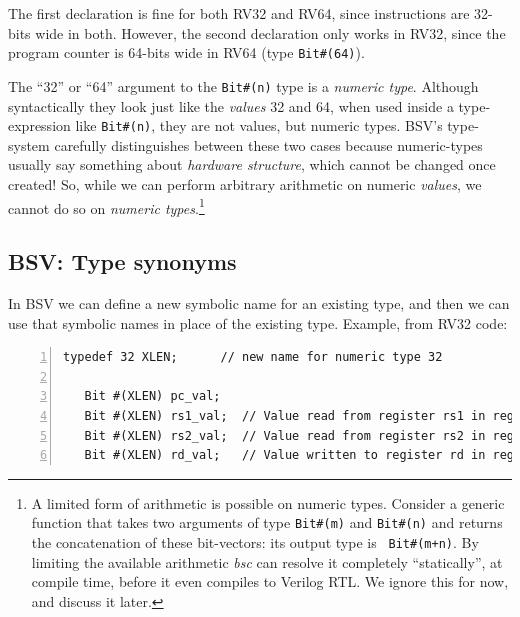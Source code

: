 The first declaration is fine for both RV32 and RV64, since
instructions are 32-bits wide in both.  However, the second
declaration only works in RV32, since the program counter is 64-bits
wide in RV64 (type \verb|Bit#(64)|).

\label{BSV_numeric_types}

The ``32'' or ``64'' argument to the \verb|Bit#(n)| type is a
\emph{numeric type}.  Although syntactically they look just like the
\emph{values} 32 and 64, when used inside a type-expression like
\verb|Bit#(n)|, they are not values, but numeric types.  BSV's
type-system carefully distinguishes between these two cases because
numeric-types usually say something about \emph{hardware structure},
which cannot be changed once created!  So, while we can perform
arbitrary arithmetic on numeric \emph{values}, we cannot do so on
\emph{numeric types}.\footnote{A limited form of arithmetic is
possible on numeric types.  Consider a generic function that takes two
arguments of type {\tt Bit\#(m)} and {\tt Bit\#(n)} and returns the
concatenation of these bit-vectors: its output type is {\tt
Bit\#(m+n)}.  By limiting the available arithmetic \emph{bsc} can
resolve it completely ``statically'', {\ie} at compile time, before it
even compiles to Verilog RTL.  We ignore this for now, and discuss it
later.}


\subsection{BSV: Type synonyms}

\label{BSV_Type_synonyms}


In BSV we can define a new symbolic name for an existing type, and
then we can use that symbolic names in place of the existing
type. Example, from RV32 code:

\begin{Verbatim}[frame=single, numbers=left]
   typedef 32 XLEN;      // new name for numeric type 32

   Bit #(XLEN) pc_val;
   Bit #(XLEN) rs1_val;  // Value read from register rs1 in register file
   Bit #(XLEN) rs2_val;  // Value read from register rs2 in register file
   Bit #(XLEN) rd_val;   // Value written to register rd in register file
\end{Verbatim}

